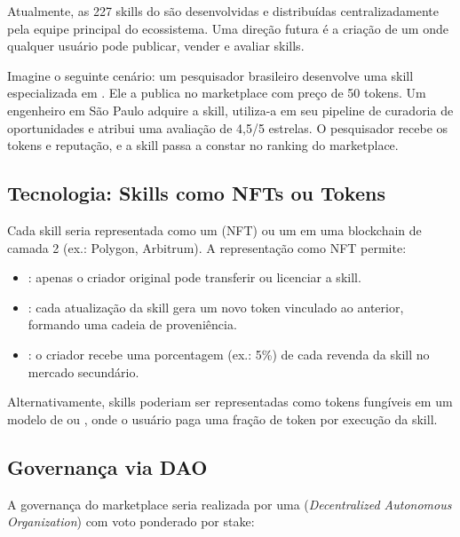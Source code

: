 Atualmente, as 227 skills do \opencodeeco{} são desenvolvidas e
distribuídas centralizadamente pela equipe principal do ecossistema.
Uma direção futura é a criação de um  onde qualquer usuário pode publicar, vender e avaliar
skills.

Imagine o seguinte cenário: um pesquisador brasileiro desenvolve uma
skill especializada em . Ele a publica no marketplace com preço
de 50 tokens. Um engenheiro em São Paulo adquire a skill, utiliza-a
em seu pipeline de curadoria de oportunidades e atribui uma
avaliação de 4,5/5 estrelas. O pesquisador recebe os tokens e
reputação, e a skill passa a constar no ranking do marketplace.

\subsection{Tecnologia: Skills como NFTs ou Tokens}

Cada skill seria representada como um 
(NFT) ou um  em uma blockchain de camada 2
(ex.: Polygon, Arbitrum). A representação como NFT permite:

\begin{itemize}
    \item {}: apenas o criador
    original pode transferir ou licenciar a skill.
    \item {}: cada atualização da skill
    gera um novo token vinculado ao anterior, formando uma cadeia
    de proveniência.
    \item {}: o criador recebe uma porcentagem
    (ex.: 5\%) de cada revenda da skill no mercado secundário.
\end{itemize}

Alternativamente, skills poderiam ser representadas como tokens
fungíveis em um modelo de  ou ,
onde o usuário paga uma fração de token por execução da skill.

\subsection{Governança via DAO}

A governança do marketplace seria realizada por uma 
(\textit{Decentralized Autonomous Organization}) com voto ponderado
por stake:

